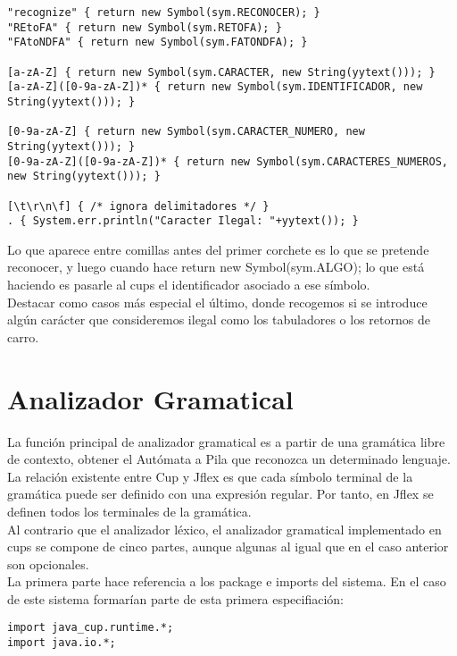 \documentclass{llncs}
\begin{document}
\begin{verbatim}
"recognize" { return new Symbol(sym.RECONOCER); }
"REtoFA" { return new Symbol(sym.RETOFA); }
"FAtoNDFA" { return new Symbol(sym.FATONDFA); }

[a-zA-Z] { return new Symbol(sym.CARACTER, new String(yytext())); }
[a-zA-Z]([0-9a-zA-Z])* { return new Symbol(sym.IDENTIFICADOR, new String(yytext())); }

[0-9a-zA-Z] { return new Symbol(sym.CARACTER_NUMERO, new String(yytext())); }
[0-9a-zA-Z]([0-9a-zA-Z])* { return new Symbol(sym.CARACTERES_NUMEROS, new String(yytext())); }

[\t\r\n\f] { /* ignora delimitadores */ }
. { System.err.println("Caracter Ilegal: "+yytext()); }
\end{verbatim}

Lo que aparece entre comillas antes del primer corchete es lo que se pretende reconocer, y luego cuando hace return new
Symbol(sym.ALGO); lo que está haciendo es pasarle al cups el identificador asociado a ese símbolo.\\

Destacar como casos más especial el último, donde recogemos si se introduce algún carácter que consideremos ilegal como
los tabuladores o los retornos de carro.\\

\section{Analizador Gramatical}

La función principal de analizador gramatical es a partir de una gramática libre de contexto, obtener el Autómata a Pila
que reconozca un determinado lenguaje.
La relación existente entre Cup y Jflex es que cada símbolo terminal de la gramática puede ser definido con una
expresión regular. Por tanto, en Jflex se definen todos los terminales de la gramática.\\

Al contrario que el analizador léxico, el analizador gramatical implementado en cups se compone de cinco partes, aunque
algunas al igual que en el caso anterior son opcionales.\\

La primera parte hace referencia a los package e imports del sistema. En el caso de este sistema formarían parte de esta
primera especifiación:\\

\begin{verbatim}
import java_cup.runtime.*;
import java.io.*;
\end{verbatim}
\end{document}
